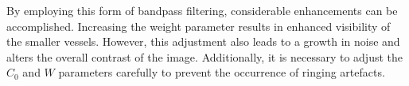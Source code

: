 By employing this form of bandpass filtering, considerable enhancements can be accomplished. Increasing the weight parameter results in enhanced visibility of the smaller vessels. However, this adjustment also leads to a growth in noise and alters the overall contrast of the image. Additionally, it is necessary to adjust the $C_0$ and $W$ parameters carefully to prevent the occurrence of ringing artefacts.